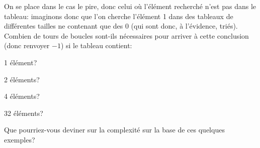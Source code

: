 \documentclass[12pt]{article}
\begin{document}
	\begin{MonExo}
		On se place dans le cas le pire, donc celui où l'élément recherché n'est pas dans le tableau: imaginons donc que l'on cherche l'élément 1 dans des tableaux de différentes tailles ne contenant que des 0 (qui sont donc, à l'évidence, triés). Combien de tours de boucles sont-ils nécessaires pour arriver à cette conclusion (donc renvoyer $-1$) si le tableau contient:
		\begin{alphenum}
			\item 1 élément?
			\item 2 éléments?
			\item 4 éléments?
			\item 32 éléments?
			\item Que pourriez-vous deviner sur la complexité sur la base de ces quelques exemples?
		\end{alphenum}
	\end{MonExo}
\end{document}
